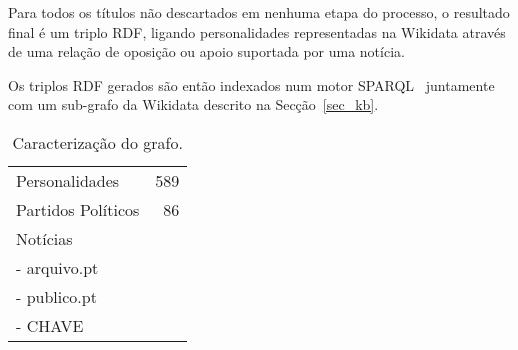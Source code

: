 \documentclass[a4paper, twocolumn, 11pt, twoside]{article}
\begin{document}
{Para todos os títulos não descartados em nenhuma etapa do processo, o resultado final é um triplo RDF, ligando personalidades representadas na Wikidata através de uma relação de oposição ou apoio suportada por uma notícia.


\begin{comment}

%


%



\end{comment}

Os triplos RDF gerados são então indexados num motor SPARQL~\citep{jena2015free} juntamente com um sub-grafo da Wikidata descrito na Secção~\ref{sec_kb}.


\begin{table}[!h]
    \begin{center}
    \begin{tabular}{l r}
        \hline
        Personalidades 	 	& 589 \\
		Partidos Políticos	&  86 \\
		Notícias			& \\
			- arquivo.pt	& \\
			- publico.pt    & \\
			- CHAVE			& \\
		\hline
    \end{tabular}
	\caption{Caracterização do grafo.}
	\label{tab:grafo}
	\end{center}
\end{table}


}
\end{document}
